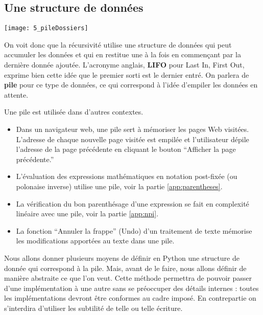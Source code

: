 \subsection{Une structure de données}
  \begin{center}
    \texttt{[image: 5\_pileDossiers]}
  \end{center}

On voit donc que la récursivité utilise une structure de données qui peut accumuler les données et qui en restitue une à la fois en commençant par la dernière donnée ajoutée. L'acronyme anglais, {\bf LIFO} pour Last In, First Out, exprime bien cette idée que le premier sorti est le dernier entré. 
On parlera de {\bf pile} pour ce type de données, ce qui correspond à l'idée d'empiler les données en attente.

\medskip

Une pile est utilisée dans d'autres contextes.

\begin{itemize}
\item Dans un navigateur web, une pile sert à mémoriser les pages Web visitées. L'adresse de chaque nouvelle page visitée est empilée et l'utilisateur dépile l'adresse de la page précédente en cliquant le bouton ``Afficher la page précédente.''
\item L'évaluation des expressions mathématiques en notation post-fixée (ou polonaise inverse) utilise une pile, voir la partie \ref{app:parentheses}.
\item La vérification du bon parenthésage d'une expression se fait en complexité linéaire avec une pile, voir la partie \ref{app:npi}.
\item La fonction ``Annuler la frappe'' (Undo) d'un traitement de texte mémorise les modifications apportées au texte dans une pile.
\end{itemize}

\medskip

Nous allons donner plusieurs moyens de définir en Python une structure de donnée qui correspond à la pile. Mais, avant de le faire, nous allons définir de manière abstraite ce que l'on veut. Cette méthode permettra de pouvoir passer d'une implémentation à une autre sans se préoccuper des détails internes : toutes les implémentations devront être conformes au cadre imposé. En contrepartie on s'interdira d'utiliser les subtilité de telle ou telle écriture. 
